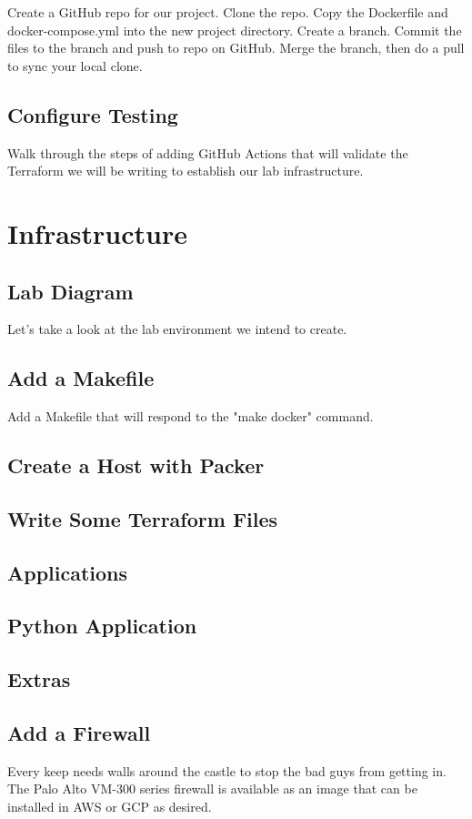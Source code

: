 Create a GitHub repo for our project. Clone the repo. Copy the
Dockerfile and docker-compose.yml into the new project directory. Create
a branch. Commit the files to the branch and push to repo on GitHub.
Merge the branch, then do a pull to sync your local clone.

\subsection{Configure Testing}

Walk through the steps of adding GitHub Actions that will validate the
Terraform we will be writing to establish our lab infrastructure.

\section{Infrastructure}

\subsection{Lab Diagram}

Let's take a look at the lab environment we intend to create.

\subsection{Add a Makefile}

Add a Makefile that will respond to the "make docker" command.

\subsection{Create a Host with Packer}

\subsection{Write Some Terraform Files}

\subsection{Applications}

\subsection{Python Application}

\subsection{Extras}

\subsection{Add a Firewall}

Every keep needs walls around the castle to stop the bad guys from
getting in. The Palo Alto VM-300 series firewall is available as an
image that can be installed in AWS or GCP as desired.
